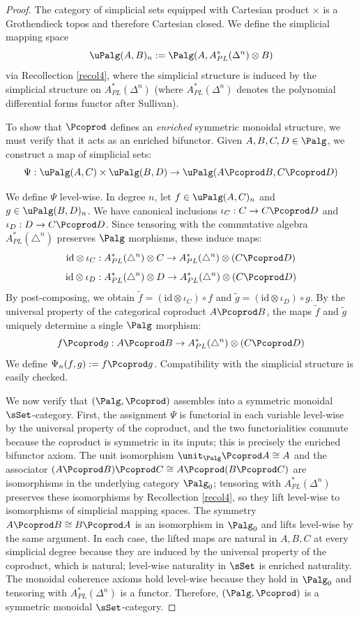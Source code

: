 \documentclass{tac}
\begin{document}
\begin{proof} 
    The category of simplicial sets equipped with Cartesian product $\times$ is a Grothendieck topos and therefore Cartesian closed. We define the simplicial mapping space 
    $$
    \uPalg(A, B)_n := \Palg(A,  A_{PL}^\ast(\Delta^n )\otimes B  )
    $$
    via Recollection \ref{recol4}, where the simplicial structure is induced by the simplicial structure on $A_{PL}^\ast(\Delta^n)$ (where $A_{PL}^\ast(\Delta^n)$ denotes the polynomial differential forms functor after Sullivan).

    To show that $\Pcoprod$ defines an \emph{enriched} symmetric monoidal structure, we must verify that it acts as an enriched bifunctor. Given $A, B, C, D \in \Palg$, we construct a map of simplicial sets:
$$
\Psi: \uPalg(A, C) \times \uPalg(B, D) \rightarrow \uPalg(A \Pcoprod B, C \Pcoprod D)
$$

We define $\Psi$ level-wise. In degree $n$, let $f \in \uPalg(A, C)_n$ and $g \in \uPalg(B, D)_n$. We have canonical inclusions $\iota_C: C \rightarrow C \Pcoprod D$ and $\iota_D: D \rightarrow C \Pcoprod D$. Since tensoring with the commutative algebra $A_{PL}^\ast(\triangle^n)$ preserves $\Palg$ morphisms, these induce maps:
$$
\text{id} \otimes \iota_C: A_{PL}^\ast(\triangle^n) \otimes C \rightarrow A_{PL}^\ast(\triangle^n) \otimes (C \Pcoprod D)
$$
$$
\text{id} \otimes \iota_D: A_{PL}^\ast(\triangle^n) \otimes D \rightarrow A_{PL}^\ast(\triangle^n) \otimes (C \Pcoprod D)
$$
By post-composing, we obtain $\tilde{f} = (\text{id} \otimes \iota_C) \circ f$ and $\tilde{g} = (\text{id} \otimes \iota_D) \circ g$. By the universal property of the categorical coproduct $A \Pcoprod B$, the maps $\tilde{f}$ and $\tilde{g}$ uniquely determine a single $\Palg$ morphism:
$$
f \Pcoprod g: A \Pcoprod B \rightarrow A_{PL}^\ast(\triangle^n) \otimes (C \Pcoprod D)
$$
We define $\Psi_n(f, g) := f \Pcoprod g$.  Compatibility with the simplicial structure is easily checked. 

We now verify that $(\Palg, \Pcoprod)$ assembles into a symmetric monoidal $\sSet$-category. First, the assignment $\Psi$ is functorial in each variable level-wise by the universal property of the coproduct, and the two functorialities commute because the coproduct is symmetric in its inputs; this is precisely the enriched bifunctor axiom. The unit isomorphism $\unit_\Palg \Pcoprod A \cong A$ and the associator $(A \Pcoprod B) \Pcoprod C \cong A \Pcoprod (B \Pcoprod C)$ are isomorphisms in the underlying category $\Palg_0$; tensoring with $A_{PL}^\ast(\Delta^n)$ preserves these isomorphisms by Recollection \ref{recol4}, so they lift level-wise to isomorphisms of simplicial mapping spaces. The symmetry $A \Pcoprod B \cong B \Pcoprod A$ is an isomorphism in $\Palg_0$ and lifts level-wise by the same argument. In each case, the lifted maps are natural in $A, B, C$ at every simplicial degree because they are induced by the universal property of the coproduct, which is natural; level-wise naturality in $\sSet$ is enriched naturality. The monoidal coherence axioms  hold level-wise because they hold in $\Palg_0$ and tensoring with $A_{PL}^\ast(\Delta^n)$ is a functor.
 Therefore, $(\Palg, \Pcoprod)$ is a symmetric monoidal $\sSet$-category.
\end{proof}
\end{document}
